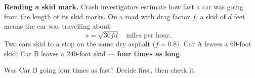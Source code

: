 \documentclass[10pt]{article}
\begin{document}
\vspace{0.10in}

\boxguard[12]
\begin{hookbox}
\small
\textbf{Reading a skid mark.} Crash investigators estimate how fast a car was going from the
length of its skid marks. On a road with drag factor $f$, a skid of $d$ feet means the car was
travelling about
\[ s = \sqrt{30fd} \quad \text{miles per hour.} \]
Two cars skid to a stop on the same dry asphalt ($f=0.8$). Car A leaves a $60$-foot skid;
Car B leaves a $240$-foot skid --- \textbf{four times as long}.

Was Car B going four times as fast? Decide first, then check it.

\\
\\
\end{hookbox}

\vspace{0.10in}
\end{document}
